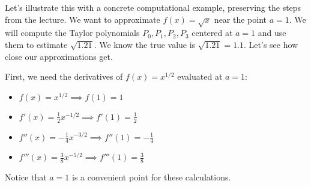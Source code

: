 \documentclass[11pt]{article}
\theoremstyle{definition}
\theoremstyle{remark}
\begin{document}
Let's illustrate this with a concrete computational example, preserving the steps from the lecture.
We want to approximate $f(x) = \sqrt{x}$ near the point $a=1$. We will compute the Taylor polynomials $P_0, P_1, P_2, P_3$ centered at $a=1$ and use them to estimate $\sqrt{1.21}$. We know the true value is $\sqrt{1.21} = 1.1$. Let's see how close our approximations get.

First, we need the derivatives of $f(x) = x^{1/2}$ evaluated at $a=1$:
\begin{itemize}
    \item $f(x) = x^{1/2} \implies f(1) = 1$
    \item $f'(x) = \frac{1}{2}x^{-1/2} \implies f'(1) = \frac{1}{2}$
    \item $f''(x) = -\frac{1}{4}x^{-3/2} \implies f''(1) = -\frac{1}{4}$
    \item $f'''(x) = \frac{3}{8}x^{-5/2} \implies f'''(1) = \frac{3}{8}$
\end{itemize}
Notice that $a=1$ is a convenient point for these calculations.
\end{document}
